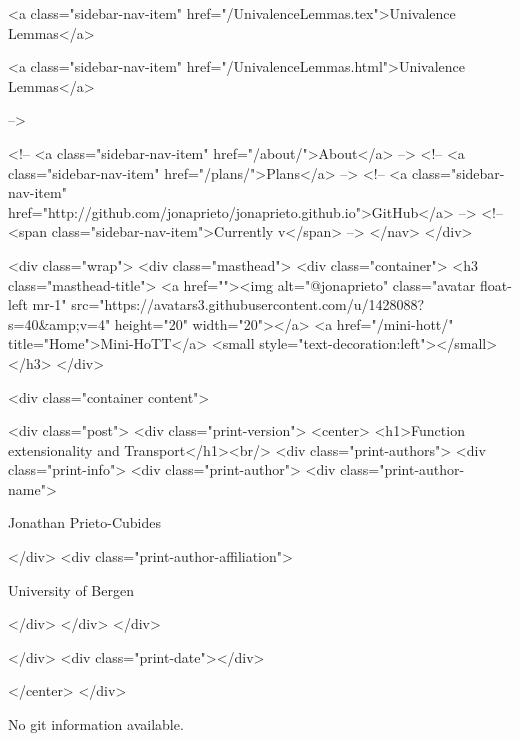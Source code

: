       
    
      
        
          <a class="sidebar-nav-item" href="/UnivalenceLemmas.tex">Univalence Lemmas</a>
        
      
    
      
        
          <a class="sidebar-nav-item" href="/UnivalenceLemmas.html">Univalence Lemmas</a>
        
      
     -->

    <!-- <a class="sidebar-nav-item" href="/about/">About</a> -->
    <!-- <a class="sidebar-nav-item" href="/plans/">Plans</a> -->
    <!-- <a class="sidebar-nav-item" href="http://github.com/jonaprieto/jonaprieto.github.io">GitHub</a> -->
    <!-- <span class="sidebar-nav-item">Currently v</span> -->
  </nav>
</div>

    <div class="wrap">
      <div class="masthead">
        <div class="container">
          <h3 class="masthead-title">
            <a href=""><img alt="@jonaprieto" class="avatar float-left mr-1" src="https://avatars3.githubusercontent.com/u/1428088?s=40&amp;v=4" height="20" width="20"></a>
            <a href="/mini-hott/" title="Home">Mini-HoTT</a>
            <small style="text-decoration:left"></small>
          </h3>
        </div>
      
      <div class="container content">
        







<div class="post">
  <div class="print-version">
    <center>
      <h1>Function extensionality and Transport</h1><br/>
        <div class="print-authors">
          <div class="print-info">
            <div class="print-author">
              <div class="print-author-name">
                
                  Jonathan Prieto-Cubides
                
              </div>
              <div class="print-author-affiliation">
                
                  University of Bergen
                
                </div>
            </div>
          </div>
          
          
        </div>
        <div class="print-date"></div>
        
        
    </center>
  </div>

  
  No git information available.
  

